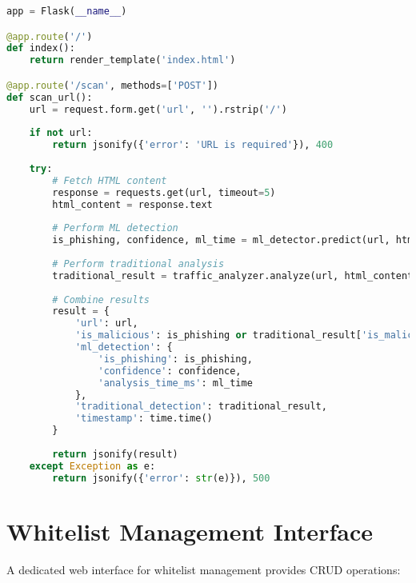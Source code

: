 \begin{lstlisting}[language=Python, caption=Scanner Web Application]
app = Flask(__name__)

@app.route('/')
def index():
    return render_template('index.html')

@app.route('/scan', methods=['POST'])
def scan_url():
    url = request.form.get('url', '').rstrip('/')
    
    if not url:
        return jsonify({'error': 'URL is required'}), 400
        
    try:
        # Fetch HTML content
        response = requests.get(url, timeout=5)
        html_content = response.text
        
        # Perform ML detection
        is_phishing, confidence, ml_time = ml_detector.predict(url, html_content)
        
        # Perform traditional analysis
        traditional_result = traffic_analyzer.analyze(url, html_content)
        
        # Combine results
        result = {
            'url': url,
            'is_malicious': is_phishing or traditional_result['is_malicious'],
            'ml_detection': {
                'is_phishing': is_phishing,
                'confidence': confidence,
                'analysis_time_ms': ml_time
            },
            'traditional_detection': traditional_result,
            'timestamp': time.time()
        }
        
        return jsonify(result)
    except Exception as e:
        return jsonify({'error': str(e)}), 500
\end{lstlisting}

\section{Whitelist Management Interface}

A dedicated web interface for whitelist management provides CRUD operations:

